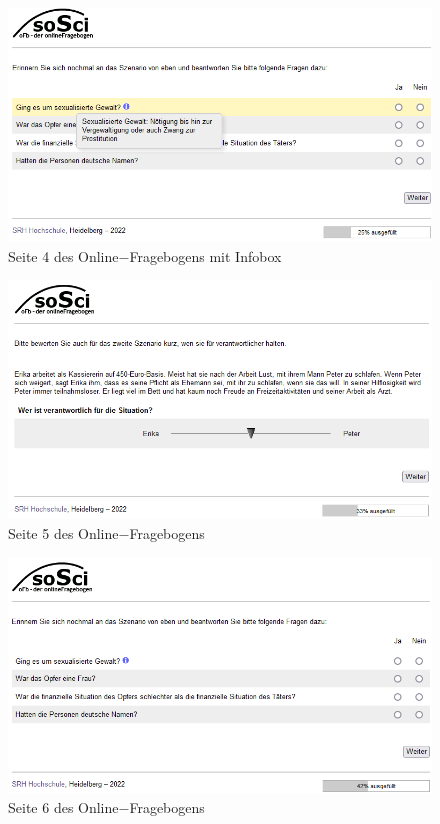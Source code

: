 \begin{appendices}
    \begin{figure}[htb!]
        \centering
            \includegraphics[width=\textwidth]{Seite 4 mit Infobox.png}
            \caption[]{Seite 4 des Online$-$Fragebogens mit Infobox}
    \end{figure}
    
    \newpage
    \begin{figure}[htb!]
        \centering
            \includegraphics[width=\textwidth]{Seite 5.png}
            \caption[]{Seite 5 des Online$-$Fragebogens}
    \end{figure}
    
    \begin{figure}[htb!]
        \centering
            \includegraphics[width=\textwidth]{Seite 6.png}
            \caption[]{Seite 6 des Online$-$Fragebogens}
    \end{figure}
    

\end{appendices}
